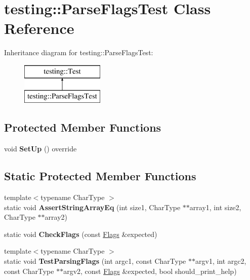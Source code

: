 \hypertarget{classtesting_1_1ParseFlagsTest}{}\section{testing\+:\+:Parse\+Flags\+Test Class Reference}
\label{classtesting_1_1ParseFlagsTest}
Inheritance diagram for testing\+:\+:Parse\+Flags\+Test\+:\begin{figure}[H]
\begin{center}
\leavevmode
\includegraphics[height=2.000000cm]{classtesting_1_1ParseFlagsTest}
\end{center}
\end{figure}
\subsection*{Protected Member Functions}
\begin{DoxyCompactItemize}
\item 
\mbox{\label{classtesting_1_1ParseFlagsTest_a91b31cd2a108511459f49e31dcbeabe8}} 
void {\bfseries Set\+Up} () override
\end{DoxyCompactItemize}
\subsection*{Static Protected Member Functions}
\begin{DoxyCompactItemize}
\item 
\mbox{\label{classtesting_1_1ParseFlagsTest_ab6e898999669ae38441ed822356a2812}} 
{\footnotesize template$<$typename Char\+Type $>$ }\\static void {\bfseries Assert\+String\+Array\+Eq} (int size1, Char\+Type $\ast$$\ast$array1, int size2, Char\+Type $\ast$$\ast$array2)
\item 
\mbox{\label{classtesting_1_1ParseFlagsTest_a5919553c35ebe3910fcff51cc0b59fd6}} 
static void {\bfseries Check\+Flags} (const \mbox{\hyperlink{structtesting_1_1Flags}{Flags}} \&expected)
\item 
\mbox{\label{classtesting_1_1ParseFlagsTest_ad769e5f5a71939c3a9ad853b415fa9d2}} 
{\footnotesize template$<$typename Char\+Type $>$ }\\static void {\bfseries Test\+Parsing\+Flags} (int argc1, const Char\+Type $\ast$$\ast$argv1, int argc2, const Char\+Type $\ast$$\ast$argv2, const \mbox{\hyperlink{structtesting_1_1Flags}{Flags}} \&expected, bool should\+\_\+print\+\_\+help)
\end{DoxyCompactItemize}
